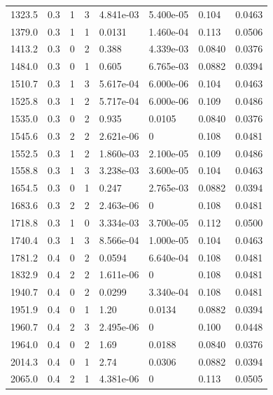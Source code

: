 \documentclass[preview]{standalone}
\begin{document}
{{{\begin{tabular}{L{1.2cm}C{1.2cm} C{0.3cm}C{0.5cm} C{1.4cm}C{1.4cm} C{1.4cm}C{1.4cm}}
  1323.5  &   0.3  & 1     &  3 &  4.841e-03  & 5.400e-05  & 0.104 &  0.0463   \\ 
  1379.0  &   0.3  & 1     &  1 &  0.0131  & 1.460e-04  & 0.113 &  0.0506   \\ 
  1413.2  &   0.3  & 0     &  2 &  0.388  & 4.339e-03  & 0.0840 &  0.0376   \\ 
  1484.0  &   0.3  & 0     &  1 &  0.605  & 6.765e-03  & 0.0882 &  0.0394   \\ 
  1510.7  &   0.3  & 1     &  3 &  5.617e-04  & 6.000e-06  & 0.104 &  0.0463   \\ 
  1525.8  &   0.3  & 1     &  2 &  5.717e-04  & 6.000e-06  & 0.109 &  0.0486   \\ 
  1535.0  &   0.3  & 0     &  2 &  0.935  & 0.0105  & 0.0840 &  0.0376   \\ 
  1545.6  &   0.3  & 2     &  2 &  2.621e-06  & 0  & 0.108 &  0.0481   \\ 
  1552.5  &   0.3  & 1     &  2 &  1.860e-03  & 2.100e-05  & 0.109 &  0.0486   \\ 
  1558.8  &   0.3  & 1     &  3 &  3.238e-03  & 3.600e-05  & 0.104 &  0.0463   \\ 
  1654.5  &   0.3  & 0     &  1 &  0.247  & 2.765e-03  & 0.0882 &  0.0394   \\ 
  1683.6  &   0.3  & 2     &  2 &  2.463e-06  & 0  & 0.108 &  0.0481   \\ 
  1718.8  &   0.3  & 1     &  0 &  3.334e-03  & 3.700e-05  & 0.112 &  0.0500   \\ 
  1740.4  &   0.3  & 1     &  3 &  8.566e-04  & 1.000e-05  & 0.104 &  0.0463   \\ 
  1781.2  &   0.4  & 0     &  2 &  0.0594  & 6.640e-04  & 0.108 &  0.0481   \\ 
  1832.9  &   0.4  & 2     &  2 &  1.611e-06  & 0  & 0.108 &  0.0481   \\ 
  1940.7  &   0.4  & 0     &  2 &  0.0299  & 3.340e-04  & 0.108 &  0.0481   \\ 
  1951.9  &   0.4  & 0     &  1 &  1.20  & 0.0134  & 0.0882 &  0.0394   \\ 
  1960.7  &   0.4  & 2     &  3 &  2.495e-06  & 0  & 0.100 &  0.0448   \\ 
  1964.0  &   0.4  & 0     &  2 &  1.69  & 0.0188  & 0.0840 &  0.0376   \\ 
  2014.3  &   0.4  & 0     &  1 &  2.74  & 0.0306  & 0.0882 &  0.0394   \\ 
  2065.0  &   0.4  & 2     &  1 &  4.381e-06  & 0  & 0.113 &  0.0505   \\ 

\end{tabular}}}}
\end{document}
